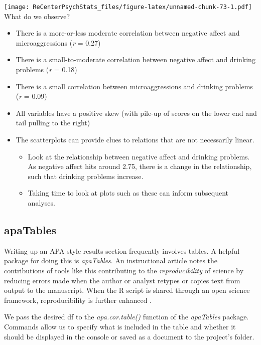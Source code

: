 \documentclass[
  11pt,
]{book}
\providecommand{\tightlist}{%
  \setlength{\itemsep}{0pt}\setlength{\parskip}{0pt}}
\begin{document}
\texttt{[image: ReCenterPsychStats\_files/figure-latex/unnamed-chunk-73-1.pdf]}
What do we observe?

\begin{itemize}
\tightlist
\item
  There is a more-or-less moderate correlation between negative affect and microaggressions (\emph{r} = 0.27)
\item
  There is a small-to-moderate correlation between negative affect and drinking problems (\emph{r} = 0.18)
\item
  There is a small correlation between microaggressions and drinking problems (\emph{r} = 0.09)
\item
  All variables have a positive skew (with pile-up of scores on the lower end and tail pulling to the right)
\item
  The scatterplots can provide clues to relations that are not necessarily linear.

  \begin{itemize}
  \tightlist
  \item
    Look at the relationship between negative affect and drinking problems. As negative affect hits around 2.75, there is a change in the relationship, such that drinking problems increase.
  \item
    Taking time to look at plots such as these can inform subsequent analyses.
  \end{itemize}
\end{itemize}

\hypertarget{apatables}{%
\subsection{apaTables}\label{apatables}}

Writing up an APA style results section frequently involves tables. A helpful package for doing this is \emph{apaTables}. An instructional article notes the contributions of tools like this contributing to the \emph{reproducibility} of science by reducing errors made when the author or analyst retypes or copies text from output to the manuscript. When the R script is shared through an open science framework, reproducibility is further enhanced \citep{stanley_reproducible_2018}.

We pass the desired df to the \emph{apa.cor.table()} function of the \emph{apaTables} package. Commands allow us to specify what is included in the table and whether it should be displayed in the console or saved as a document to the project's folder.
\end{document}
